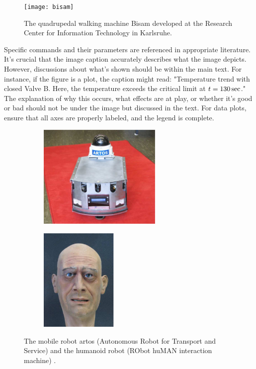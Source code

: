 \begin{figure}
  \begin{center}
    \texttt{[image: bisam]}
    \caption{The quadrupedal walking machine Bisam developed at the Research Center
    for Information Technology in Karlsruhe.}
    \label{fig:bisam}
  \end{center}
\end{figure}

Specific commands and their parameters are referenced in appropriate literature. It's crucial that the image caption accurately describes what the image depicts. However, discussions about what's shown should be within the main text. For instance, if the figure is a plot, the caption might read: "Temperature trend with closed Valve B. Here, the temperature exceeds the critical limit at $t=\unit[130]{sec}$." The explanation of why this occurs, what effects are at play, or whether it's good or bad should not be under the image but discussed in the text. For data plots, ensure that all axes are properly labeled, and the legend is complete.

\begin{figure}
  \begin{subfigure}[b]{.5\linewidth}
    \centering \includegraphics[height=5cm]{images/roter_teppich}
    \caption{\RRLABartos}
    \label{subfig:artos}
  \end{subfigure}%
  \hspace{1cm}
  \begin{subfigure}[b]{.5\linewidth}
    \centering \includegraphics[height=5cm]{images/roman_mask}
    \caption{\RRLABroman}
    \label{subfig:roman}
  \end{subfigure}
  \caption{The mobile robot artos \RRLABartos (Autonomous Robot for Transport and Service)
    and the humanoid robot \RRLABroman (RObot huMAN interaction machine)
  .}
  \label{fig:artos_and_roman}
\end{figure}

